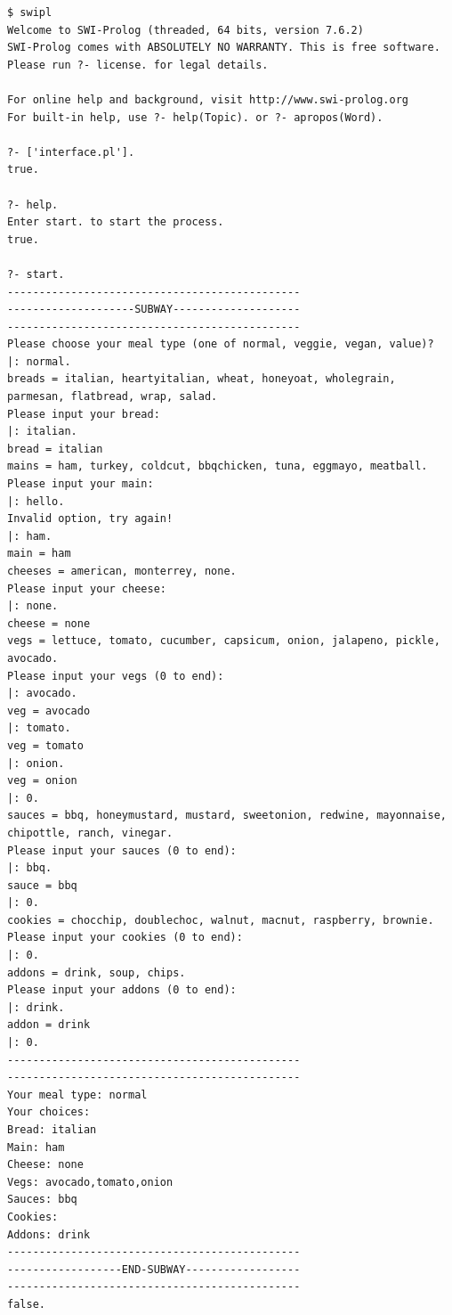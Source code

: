 \documentclass[11pt]{report}
\begin{document}
\begin{lstlisting}
$ swipl
Welcome to SWI-Prolog (threaded, 64 bits, version 7.6.2)
SWI-Prolog comes with ABSOLUTELY NO WARRANTY. This is free software.
Please run ?- license. for legal details.

For online help and background, visit http://www.swi-prolog.org
For built-in help, use ?- help(Topic). or ?- apropos(Word).

?- ['interface.pl'].
true.

?- help.
Enter start. to start the process.
true.

?- start.
----------------------------------------------
--------------------SUBWAY--------------------
----------------------------------------------
Please choose your meal type (one of normal, veggie, vegan, value)?
|: normal.
breads = italian, heartyitalian, wheat, honeyoat, wholegrain, parmesan, flatbread, wrap, salad.
Please input your bread:
|: italian.
bread = italian
mains = ham, turkey, coldcut, bbqchicken, tuna, eggmayo, meatball.
Please input your main:
|: hello.
Invalid option, try again!
|: ham.
main = ham
cheeses = american, monterrey, none.
Please input your cheese:
|: none.
cheese = none
vegs = lettuce, tomato, cucumber, capsicum, onion, jalapeno, pickle, avocado.
Please input your vegs (0 to end):
|: avocado.
veg = avocado
|: tomato.
veg = tomato
|: onion.
veg = onion
|: 0.
sauces = bbq, honeymustard, mustard, sweetonion, redwine, mayonnaise, chipottle, ranch, vinegar.
Please input your sauces (0 to end):
|: bbq.
sauce = bbq
|: 0.
cookies = chocchip, doublechoc, walnut, macnut, raspberry, brownie.
Please input your cookies (0 to end):
|: 0.
addons = drink, soup, chips.
Please input your addons (0 to end):
|: drink.
addon = drink
|: 0.
----------------------------------------------
----------------------------------------------
Your meal type: normal
Your choices:
Bread: italian
Main: ham
Cheese: none
Vegs: avocado,tomato,onion
Sauces: bbq
Cookies:
Addons: drink
----------------------------------------------
------------------END-SUBWAY------------------
----------------------------------------------
false.
\end{lstlisting}
\end{document}
